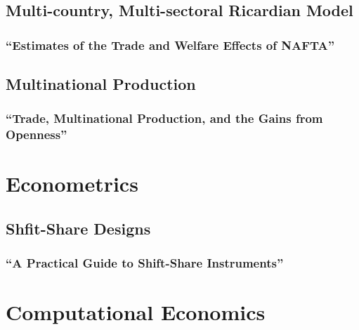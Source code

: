 \documentclass[11pt]{report}
\theoremstyle{definition}
\numberwithin{equation}{section}
\numberwithin{figure}{section}
\numberwithin{table}{section}
\begin{document}
\section{Multi-country, Multi-sectoral Ricardian Model}
\subsection{``Estimates of the Trade and Welfare Effects of NAFTA'' \\ \citep{Caliendo:2015}} 

\section{Multinational Production}


\subsection{``Trade, Multinational Production, and the Gains from Openness'' \\ \citep{Ramondo:2013}} 



\chapter{Econometrics}
\section{Shfit-Share Designs}
\subsection{``A Practical Guide to Shift-Share Instruments'' \\ \citep{Borusyak:2024}} 







\chapter{Computational Economics}



\end{document}
